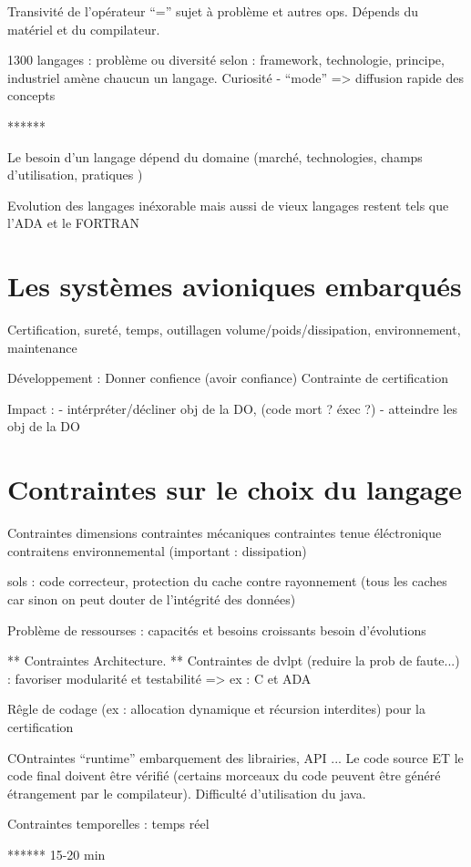 \documentclass[a4paper,12pt]{article}
\begin{document}
Transivité de l'opérateur ``='' sujet à problème et autres ops.
Dépends du matériel et du compilateur.


1300 langages : problème ou diversité
selon : framework, technologie, principe, industriel amène chaucun un
langage. Curiosité - ``mode'' => diffusion rapide des concepts



******


Le besoin d'un langage dépend du domaine (marché, technologies, champs
d'utilisation, pratiques )

Evolution des langages inéxorable mais aussi de vieux langages restent
tels que l'ADA et le FORTRAN
\section{Les systèmes avioniques embarqués }
Certification, sureté, temps, outillagen volume/poids/dissipation,
environnement, maintenance

Développement : 
Donner confience (avoir confiance) 
Contrainte de certification

Impact : 
- intérpréter/décliner obj de la DO, (code mort ? éxec ?)
- atteindre les obj de la DO
\section{Contraintes sur le choix du langage}
Contraintes dimensions 
contraintes mécaniques
contraintes tenue éléctronique
contraitens environnemental (important : dissipation)

sols : code correcteur, protection du cache contre rayonnement (tous
les caches car sinon on peut douter de l'intégrité des données)

Problème de ressourses :
 capacités et besoins croissants
 besoin d'évolutions

** Contraintes Architecture.
** Contraintes de dvlpt (reduire la prob de faute...) : favoriser
modularité et testabilité => ex : C et ADA

Rêgle de codage (ex : allocation dynamique et récursion interdites)
pour la certification

COntraintes ``runtime''
embarquement des librairies, API ...
Le code source ET le code final doivent être vérifié (certains
morceaux du code peuvent être généré étrangement par le compilateur).
Difficulté d'utilisation du java.

Contraintes temporelles :
temps réel

****** 15-20 min
\end{document}

